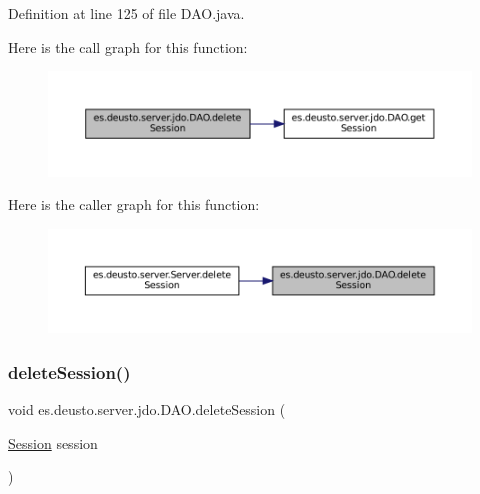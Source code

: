 Definition at line 125 of file D\+A\+O.\+java.

Here is the call graph for this function\+:
\nopagebreak
\begin{figure}[H]
\begin{center}
\leavevmode
\includegraphics[width=350pt]{classes_1_1deusto_1_1server_1_1jdo_1_1_d_a_o_a399605bc2a2fd86679ddf7793b71de12_cgraph}
\end{center}
\end{figure}
Here is the caller graph for this function\+:
\nopagebreak
\begin{figure}[H]
\begin{center}
\leavevmode
\includegraphics[width=350pt]{classes_1_1deusto_1_1server_1_1jdo_1_1_d_a_o_a399605bc2a2fd86679ddf7793b71de12_icgraph}
\end{center}
\end{figure}
\mbox{\label{classes_1_1deusto_1_1server_1_1jdo_1_1_d_a_o_aa4010f98d33fbdb583bb361ab576ff2d}} 
\subsubsection{\texorpdfstring{deleteSession()}{deleteSession()}\hspace{0.1cm}{\footnotesize\ttfamily [2/2]}}
{\footnotesize\ttfamily void es.\+deusto.\+server.\+jdo.\+D\+A\+O.\+delete\+Session (\begin{DoxyParamCaption}\item[{\mbox{\hyperlink{classes_1_1deusto_1_1server_1_1jdo_1_1_session}{Session}}}]{session }\end{DoxyParamCaption})}



